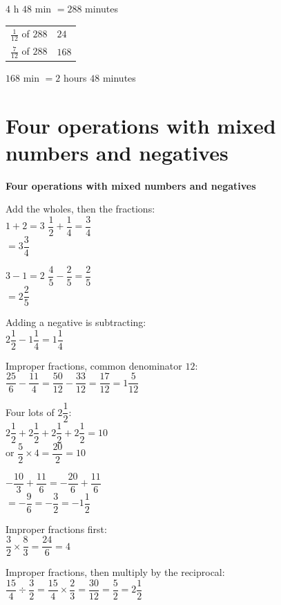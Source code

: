 \documentclass[aspectratio=169]{beamer}
\makeatletter
\newcommand{\qtopic}[1]{%
  \section{#1}%
  \begin{frame}[plain]
    \vfill
    \begin{center}
      {\usebeamercolor[fg]{structure}\Huge\bfseries #1}
    \end{center}
    \vfill
  \end{frame}%
}
\newcommand{\steps}[1]{%
  {\renewcommand{\arraystretch}{1.5}%
   \begin{tabular}{@{}r@{\ is\ }l@{}}#1\end{tabular}}%
}
\makeatother
\begin{document}
  {$4$ h $48$ min $=288$ minutes\\[0.4em]
   \steps{$\frac{1}{12}$ of $288$ & $24$ \\ $\frac{7}{12}$ of $288$ & $168$}
   \par\vspace{0.4em}
   $168$ min $=2$ hours $48$ minutes}

\qtopic{Four operations with mixed numbers and negatives}

  {Add the wholes, then the fractions:\\[0.4em]
   $1+2=3$ \qquad $\dfrac12+\dfrac14=\dfrac34$\\[0.4em]
   $=3\dfrac34$}

  {$3-1=2$ \qquad $\dfrac45-\dfrac25=\dfrac25$\\[0.4em]
   $=2\dfrac25$}

  {Adding a negative is subtracting:\\[0.4em]
   $2\dfrac12-1\dfrac14=1\dfrac14$}

  {Improper fractions, common denominator $12$:\\[0.4em]
   $\dfrac{25}{6}-\dfrac{11}{4}=\dfrac{50}{12}-\dfrac{33}{12}=\dfrac{17}{12}=1\dfrac{5}{12}$}

  {Four lots of $2\dfrac12$:\\[0.4em]
   $2\dfrac12+2\dfrac12+2\dfrac12+2\dfrac12=10$\\[0.4em]
   or $\dfrac52\times 4=\dfrac{20}{2}=10$}

  {$-\dfrac{10}{3}+\dfrac{11}{6}=-\dfrac{20}{6}+\dfrac{11}{6}$\\[0.4em]
   $=-\dfrac{9}{6}=-\dfrac32=-1\dfrac12$}

  {Improper fractions first:\\[0.4em]
   $\dfrac32\times\dfrac83=\dfrac{24}{6}=4$}

  {Improper fractions, then multiply by the reciprocal:\\[0.4em]
   $\dfrac{15}{4}\div\dfrac32=\dfrac{15}{4}\times\dfrac23=\dfrac{30}{12}=\dfrac52=2\dfrac12$}
\end{document}
